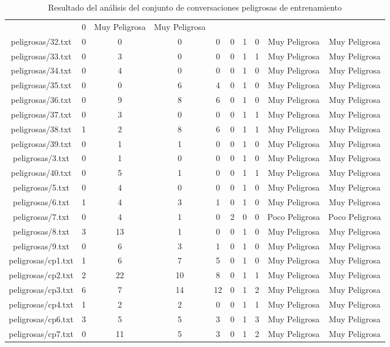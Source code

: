 \begin{table}[h]
\begin{tabular}{|c|c|c|c|c|c|c|c|c|c|}
& 0
& Muy Peligrosa
& Muy Peligrosa \\
peligrosas/32.txt
&  0
& 0
& 0
& 0
& 0
& 1
& 0
& Muy Peligrosa
& Muy Peligrosa \\
peligrosas/33.txt
&  0
& 3
& 0
& 0
& 0
& 1
& 1
& Muy Peligrosa
& Muy Peligrosa \\
peligrosas/34.txt
&  0
& 4
& 0
& 0
& 0
& 1
& 0
& Muy Peligrosa
& Muy Peligrosa \\
peligrosas/35.txt
&  0
& 0
& 6
& 4
& 0
& 1
& 0
& Muy Peligrosa
& Muy Peligrosa \\
peligrosas/36.txt
&  0
& 9
& 8
& 6
& 0
& 1
& 0
& Muy Peligrosa
& Muy Peligrosa \\
peligrosas/37.txt
&  0
& 3
& 0
& 0
& 0
& 1
& 1
& Muy Peligrosa
& Muy Peligrosa \\
peligrosas/38.txt
&  1
& 2
& 8
& 6
& 0
& 1
& 1
& Muy Peligrosa
& Muy Peligrosa \\
peligrosas/39.txt
&  0
& 1
& 1
& 0
& 0
& 1
& 0
& Muy Peligrosa
& Muy Peligrosa \\
peligrosas/3.txt
&  0
& 1
& 0
& 0
& 0
& 1
& 0
& Muy Peligrosa
& Muy Peligrosa \\
peligrosas/40.txt
&  0
& 5
& 1
& 0
& 0
& 1
& 1
& Muy Peligrosa
& Muy Peligrosa \\
peligrosas/5.txt
&  0
& 4
& 0
& 0
& 0
& 1
& 0
& Muy Peligrosa
& Muy Peligrosa \\
peligrosas/6.txt
&  1
& 4
& 3
& 1
& 0
& 1
& 0
& Muy Peligrosa
& Muy Peligrosa \\
peligrosas/7.txt
&  0
& 4
& 1
& 0
& 2
& 0
& 0
& Poco Peligrosa
& Poco Peligrosa \\
peligrosas/8.txt
&  3
& 13
& 1
& 0
& 0
& 1
& 0
& Muy Peligrosa
& Muy Peligrosa \\
peligrosas/9.txt
&  0
& 6
& 3
& 1
& 0
& 1
& 0
& Muy Peligrosa
& Muy Peligrosa \\
peligrosas/cp1.txt
&  1
& 6
& 7
& 5
& 0
& 1
& 0
& Muy Peligrosa
& Muy Peligrosa \\
peligrosas/cp2.txt
&  2
& 22
& 10
& 8
& 0
& 1
& 1
& Muy Peligrosa
& Muy Peligrosa \\
peligrosas/cp3.txt
&  6
& 7
& 14
& 12
& 0
& 1
& 2
& Muy Peligrosa
& Muy Peligrosa \\
peligrosas/cp4.txt
&  1
& 2
& 2
& 0
& 0
& 1
& 1
& Muy Peligrosa
& Muy Peligrosa \\
peligrosas/cp6.txt
&  3
& 5
& 5
& 3
& 0
& 1
& 3
& Muy Peligrosa
& Muy Peligrosa \\
peligrosas/cp7.txt
&  0
& 11
& 5
& 3
& 0
& 1
& 2
& Muy Peligrosa
& Muy Peligrosa \\
\hline
\end{tabular}
\label{tab:tablaresultadosconjuntoentrenamientopeligroso}
\caption{Resultado del an\'alisis del conjunto de conversaciones peligrosas de entrenamiento}
\end{table}


